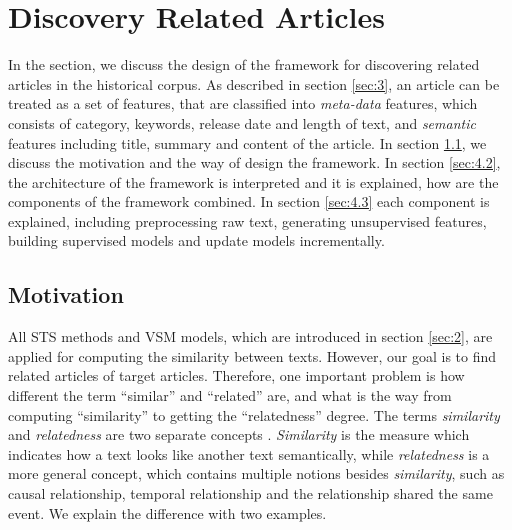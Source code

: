 \section{Discovery Related Articles}

In the section, we discuss the design of the framework for discovering related articles in the historical corpus. As described in section \ref{sec:3}, an article can be treated as a set of features, that are classified into \textit{meta-data} features, which consists of category, keywords, release date and length of text, and \textit{semantic} features including title, summary and content of the article. In section \ref{sec:4.1}, we discuss the motivation and the way of design the framework. In section \ref{sec:4.2}, the architecture of the framework is interpreted and it is explained, how are the components of the framework combined. In section \ref{sec:4.3} each component is explained, including preprocessing raw text, generating unsupervised features, building supervised models and update models incrementally. 

\subsection{Motivation}
\label{sec:4.1}

All STS methods and VSM models, which are introduced in section \ref{sec:2}, are applied for computing the similarity between texts. However, our goal is to find related articles of target articles. Therefore, one important problem is how different the term ``similar'' and ``related'' are, and what is the way from computing ``similarity'' to getting the ``relatedness'' degree. The terms \textit{similarity} and \textit{relatedness} are two separate concepts \cite{pedersen2007measures}. \textit{Similarity} is the measure which indicates how a text looks like another text semantically, while \textit{relatedness} is a more general concept, which contains multiple notions besides \textit{similarity}, such as causal relationship, temporal relationship and the relationship shared the same event. We explain the difference with two examples. 


